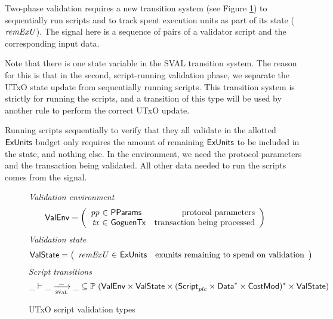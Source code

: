 Two-phase validation requires a new transition system
(see Figure \ref{fig:ts-types:utxos}) to sequentially run
scripts and to track spent execution units as part of its state
($\mathit{remExU}$). The signal here is a sequence of pairs of a validator
script and the corresponding input data.

Note that there is one state variable in the SVAL transition system. The reason
for this is that in the second, script-running validation phase, we separate
the UTxO state update from sequentially running scripts. This transition
system is strictly for running the scripts, and a transition of this type
will be used by another rule to perform the correct UTxO update.

Running scripts sequentially
to verify that they all validate in the allotted $\mathsf{ExUnits}$ budget only requires
the amount of remaining $\mathsf{ExUnits}$ to be included in the state, and nothing else.
In the environment, we need the protocol parameters and the
transaction being validated. All other data needed
to run the scripts comes from the signal.

\begin{figure}[htb]
  \emph{Validation environment}
  \begin{equation*}
    \ValEnv =
    \left(
      \begin{array}{r@{~\in~}lr}
        \var{pp} & \PParams & \text{protocol parameters}\\
        \var{tx} & \GoguenTx & \text{transaction being processed} \\
      \end{array}
    \right)
  \end{equation*}
  \emph{Validation state}
  \begin{equation*}
    \ValState =
    \left(
      \begin{array}{r@{~\in~}lr}
        \var{remExU} & \ExUnits & \text{exunits remaining to spend on validation} \\
      \end{array}
    \right)
  \end{equation*}
  \emph{Script transitions}
  \begin{equation*}
    \_ \vdash
    \var{\_} \trans{sval}{\_} \var{\_}
    \subseteq \powerset (\ValEnv \times \ValState \times \seqof{(\ScriptPlutus\times\seqof{\Data}\times\CostMod)} \times \ValState)
  \end{equation*}
  \caption{UTxO script validation types}
  \label{fig:ts-types:utxos}
\end{figure}

